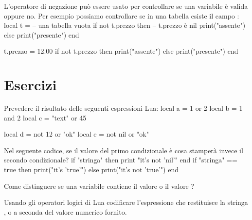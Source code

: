 L'operatore di negazione può essere usato per controllare se una variabile è
valida oppure no. Per esempio possiamo controllare se in una tabella esiste il
campo :
\lines
local t = {} -- una tabella vuota
if not t.prezzo then -- t.prezzo è nil
    print("assente")
else
    print("presente")
end

t.prezzo = 12.00
if not t.prezzo then
    print("assente")
else
    print("presente")
end
\endlines
{}


\section{Esercizi}

\begin{Exercise}[label=oplogic-01]
Prevedere il risultato delle seguenti espressioni Lua:
\lines
local a = 1 or 2
local b = 1 and 2
local c = "text" or 45

local d = not 12 or "ok"
local e = not nil or "ok"
\endlines
{}
\end{Exercise}

\begin{Exercise}[label=oplogic-02]
Nel seguente codice, se il valore del primo condizionale è  cosa
stamperà invece il secondo condizionale?
\lines
if "stringa" then print "it's not 'nil'" end
if "stringa" == true then
    print("it's 'true'")
else
    print("it's not 'true'")
end
\endlines
{}
\end{Exercise}

\begin{Exercise}[label=oplogic-03]
Come distinguere se una variabile contiene il valore  o il valore
?  
\end{Exercise}

\begin{Exercise}[label=oplogic-04]
Usando gli operatori logici di Lua codificare l'espressione che restituisce
la stringa ,  o  a seconda del valore numerico fornito.
\end{Exercise}




